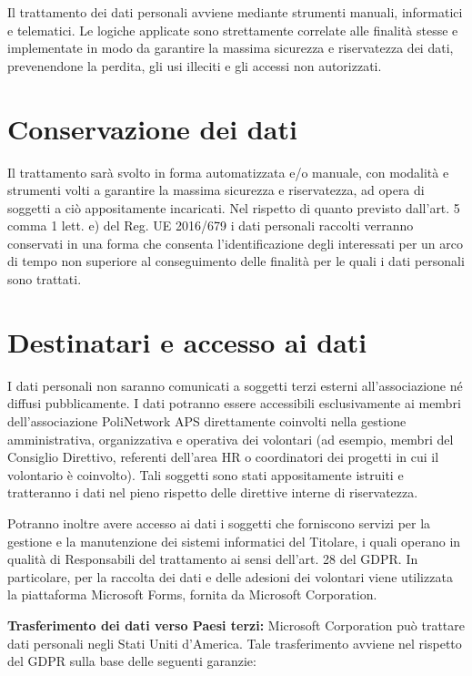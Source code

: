 \documentclass[legal]{polinetwork}
\begin{document}
Il trattamento dei dati personali avviene mediante strumenti manuali, informatici e telematici. Le logiche applicate sono strettamente correlate alle finalità stesse e implementate in modo da garantire la massima sicurezza e riservatezza dei dati, prevenendone la perdita, gli usi illeciti e gli accessi non autorizzati.

\section{Conservazione dei dati}

Il trattamento sarà svolto in forma automatizzata e/o manuale, con modalità e strumenti volti a garantire la massima sicurezza e riservatezza, ad opera di soggetti a ciò appositamente incaricati. Nel rispetto di quanto previsto dall'art. 5 comma 1 lett. e) del Reg. UE 2016/679 i dati personali raccolti verranno conservati in una forma che consenta l'identificazione degli interessati per un arco di tempo non superiore al conseguimento delle finalità per le quali i dati personali sono trattati.

\section{Destinatari e accesso ai dati}

I dati personali non saranno comunicati a soggetti terzi esterni all'associazione né diffusi pubblicamente. I dati potranno essere accessibili esclusivamente ai membri dell'associazione PoliNetwork APS direttamente coinvolti nella gestione amministrativa, organizzativa e operativa dei volontari (ad esempio, membri del Consiglio Direttivo, referenti dell'area HR o coordinatori dei progetti in cui il volontario è coinvolto). Tali soggetti sono stati appositamente istruiti e tratteranno i dati nel pieno rispetto delle direttive interne di riservatezza.

Potranno inoltre avere accesso ai dati i soggetti che forniscono servizi per la gestione e la manutenzione dei sistemi informatici del Titolare, i quali operano in qualità di Responsabili del trattamento ai sensi dell'art. 28 del GDPR. In particolare, per la raccolta dei dati e delle adesioni dei volontari viene utilizzata la piattaforma Microsoft Forms, fornita da Microsoft Corporation.

\textbf{Trasferimento dei dati verso Paesi terzi:} Microsoft Corporation può trattare dati personali negli Stati Uniti d'America. Tale trasferimento avviene nel rispetto del GDPR sulla base delle seguenti garanzie:
\end{document}
